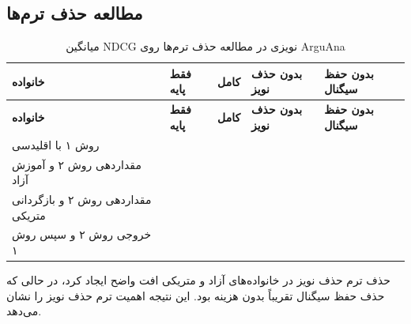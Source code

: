 \documentclass[a4paper,12pt]{article}
\begin{document}
\subsection{مطالعه حذف ترم‌ها}
\scriptsize
\begin{longtable}{|C{5.5cm}|C{2.4cm}|C{2.4cm}|C{2.4cm}|C{2.6cm}|}
\caption{میانگین NDCG نویزی در مطالعه حذف ترم‌ها روی ArguAna}\label{tab:arg-ablation}\\
\hline
\textbf{خانواده} & \textbf{فقط پایه} & \textbf{کامل} & \textbf{بدون حذف نویز} & \textbf{بدون حفظ سیگنال} \\
\hline
\endfirsthead
\hline
\textbf{خانواده} & \textbf{فقط پایه} & \textbf{کامل} & \textbf{بدون حذف نویز} & \textbf{بدون حفظ سیگنال} \\
\hline
\endhead
روش ۱ با  اقلیدسی &  & \textbf{} &  &  \\
\hline
مقداردهی روش ۲ و آموزش آزاد &  & \textbf{} &  &  \\
\hline
مقداردهی روش ۲ و بازگردانی متریکی &  &  &  & \textbf{} \\
\hline
{} خروجی روش ۲ و سپس روش ۱ &  &  &  & \textbf{} \\
\hline
\end{longtable}
حذف ترم حذف نویز در خانواده‌های آزاد و متریکی افت واضح ایجاد کرد، در حالی که حذف حفظ سیگنال تقریباً بدون هزینه بود. این نتیجه اهمیت ترم حذف نویز را نشان می‌دهد.
\end{document}
